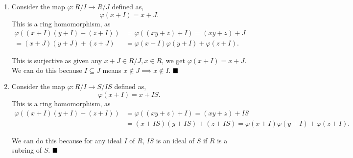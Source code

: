 \documentclass[12pt]{article}
\begin{document}
\textcolor{maroon}{}\begin{enumerate}[label = (\alph*)]
    \item Consider the map \( \varphi: R/I \to R/J \) defined as,
          \[
              \varphi(x + I) = x + J.
          \]
          This is a ring homomorphism, as \begin{align*}
            \varphi((x+I)(y+I) + (z+I))& = \varphi((xy+z)+I) = (xy+z)+J \\
            = (x+J)(y+J)+(z+J) &= \varphi(x+I)\varphi(y+I) + \varphi(z+I).
          \end{align*}
              
          This is surjective as given any \( x+J \in R/J, x \in R \), we get \( \varphi(x+I) = x+J \). We can do this because \( I \subseteq J \) means \( x \notin J \implies x \notin I \). \(\hfill \blacksquare\)
          \smallskip

    \item Consider the map \( \varphi: R/I \to S/IS \) defined as,
          \[
              \varphi(x + I) = x + IS.
          \]
          This is a ring homomorphism, as \begin{align*}
            \varphi((x+I)(y+I) + (z+I)) &= \varphi((xy+z)+I) = (xy+z)+IS \\
            &= (x+IS)(y+IS)+(z+IS)= \varphi(x+I)\varphi(y+I) + \varphi(z+I).
          \end{align*}
             
          
          We can do this because for any ideal \( I \) of \( R \), \( IS \) is an ideal of \( S \) if \( R \) is a subring of \( S \). \(\hfill \blacksquare\)
\end{enumerate}
\end{document}
